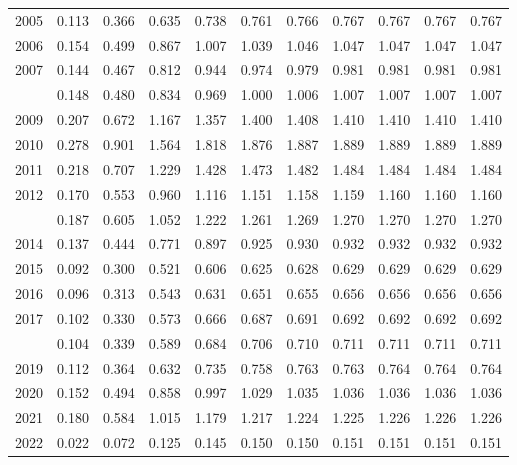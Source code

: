 \documentclass[
]{article}
\begin{document}
\begin{longtable}[t]{lrrrrrrrrrr}
2005 & 0.113 & 0.366 & 0.635 & 0.738 & 0.761 & 0.766 & 0.767 & 0.767 & 0.767 & 0.767\\
2006 & 0.154 & 0.499 & 0.867 & 1.007 & 1.039 & 1.046 & 1.047 & 1.047 & 1.047 & 1.047\\
2007 & 0.144 & 0.467 & 0.812 & 0.944 & 0.974 & 0.979 & 0.981 & 0.981 & 0.981 & 0.981\\
\addlinespace
2008 & 0.148 & 0.480 & 0.834 & 0.969 & 1.000 & 1.006 & 1.007 & 1.007 & 1.007 & 1.007\\
2009 & 0.207 & 0.672 & 1.167 & 1.357 & 1.400 & 1.408 & 1.410 & 1.410 & 1.410 & 1.410\\
2010 & 0.278 & 0.901 & 1.564 & 1.818 & 1.876 & 1.887 & 1.889 & 1.889 & 1.889 & 1.889\\
2011 & 0.218 & 0.707 & 1.229 & 1.428 & 1.473 & 1.482 & 1.484 & 1.484 & 1.484 & 1.484\\
2012 & 0.170 & 0.553 & 0.960 & 1.116 & 1.151 & 1.158 & 1.159 & 1.160 & 1.160 & 1.160\\
\addlinespace
2013 & 0.187 & 0.605 & 1.052 & 1.222 & 1.261 & 1.269 & 1.270 & 1.270 & 1.270 & 1.270\\
2014 & 0.137 & 0.444 & 0.771 & 0.897 & 0.925 & 0.930 & 0.932 & 0.932 & 0.932 & 0.932\\
2015 & 0.092 & 0.300 & 0.521 & 0.606 & 0.625 & 0.628 & 0.629 & 0.629 & 0.629 & 0.629\\
2016 & 0.096 & 0.313 & 0.543 & 0.631 & 0.651 & 0.655 & 0.656 & 0.656 & 0.656 & 0.656\\
2017 & 0.102 & 0.330 & 0.573 & 0.666 & 0.687 & 0.691 & 0.692 & 0.692 & 0.692 & 0.692\\
\addlinespace
2018 & 0.104 & 0.339 & 0.589 & 0.684 & 0.706 & 0.710 & 0.711 & 0.711 & 0.711 & 0.711\\
2019 & 0.112 & 0.364 & 0.632 & 0.735 & 0.758 & 0.763 & 0.763 & 0.764 & 0.764 & 0.764\\
2020 & 0.152 & 0.494 & 0.858 & 0.997 & 1.029 & 1.035 & 1.036 & 1.036 & 1.036 & 1.036\\
2021 & 0.180 & 0.584 & 1.015 & 1.179 & 1.217 & 1.224 & 1.225 & 1.226 & 1.226 & 1.226\\
2022 & 0.022 & 0.072 & 0.125 & 0.145 & 0.150 & 0.150 & 0.151 & 0.151 & 0.151 & 0.151\\*
\end{longtable}
\end{document}
